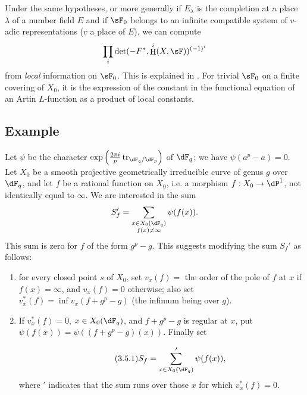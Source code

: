\documentclass[oneside]{book}
\DeclareMathOperator{\h}{H}
\DeclareMathOperator{\tr}{tr}
\newcounter{char}
\theoremstyle{sga-source}
\theoremstyle{sga-source-dash}
\theoremstyle{sga-source-dotdash}
\theoremstyle{sga-source-number-note-dash}
\theoremstyle{sga-source-note-number-dotdash}
\theoremstyle{sga-source-example-dotdash}
\theoremstyle{sga-source-inline-number}
\theoremstyle{sga-source-bare-number}
\theoremstyle{sga-source}
\newcommand{\PrintPage}[1]{}\newcommand{\MathPage}[1]{}\newcommand{\PrintCite}[2]{#1}\newcommand{\var}[3]{#1}
\begin{document}
Under the same hypotheses, or more generally if $E_\lambda$ is the 
completion at a place $\lambda$ of a number field $E$ and if $\sF_0$ 
belongs to an infinite compatible system of $v$-adic representations 
($v$ a place of $E$), we can compute 
\[
  \prod_i \det(-F^\ast,\h^i(X,\sF))^{(-1)^i} 
\]
from \emph{local} information on $\sF_0$. This is explained in 
\cite{de73}. For trivial $\sF_0$ on a finite covering of $X_0$, it is 
the expression of the constant in the functional equation of an Artin 
$L$-function as a product of local constants. 





\subsection{Example}\label{VI:3-5}

Let $\psi$ be the character 
$\exp\left(\frac{2\pi i}{p} \tr_{\dF_q/\dF_p}\right)$ of $\dF_q$; we have 
$\var{\psi(a^p-a)=0}{\psi(a^p-a)=1}{S45-SOL-0760}$. Let $X_0$ be a smooth projective geometrically 
irreducible curve of genus $g$ over $\dF_q$, and let $f$ be a rational function on 
$X_0$, i.e. a morphism $f:X_0 \to \dP^1$, not identically equal to 
$\infty$. We are interested in the sum 
\[
  S_f' = \sum_{\substack{x\in X_0(\dF_q) \\ f(x)\ne \infty}} \psi(f(x)) 
  \text{.}
\]
\var{This sum is zero for $f$ of the form $g^p-g$.}{For $f$ of the form $g^p-g$, this sum equals $\#\{x\in X_0(\dF_q)\mid f(x)\ne\infty\}$.}{S45-SOL-0763} This suggests modifying 
the sum $S_f'$ as follows: 
\begin{enumerate}[\indent a)]
  \item \var{for every closed point $s$}{for every closed point $x$}{S45-SOL-0765} of $X_0$, set $v_x(f) = $ the order of the 
    pole of $f$ at $x$ if $f(x)=\infty$, and $v_x(f)=0$ otherwise; also set 
    $v_x^\ast(f) = \inf v_x(f+g^p-g)$ (the infimum being over $g$). 
  \item If $v_x^\ast(f)=0$, $x\in X_0(\dF_q)$, and $f+g^p-g$ is 
    regular at $x$, put $\psi(f(x)) = \psi((f+g^p-g)(x))$. Finally set 
    \PrintPage{191}
\begin{equation*}\tag{3.5.1}\label{VI:eq:3-5-1}
      S_f = \sum'_{x\in X_0(\dF_q)} \psi(f(x)) \text{,}
    \end{equation*}
    where $\prime$ indicates that the sum runs over those $x$ for which 
    $v_x^\ast(f)=0$. 
\end{enumerate}
\end{document}
